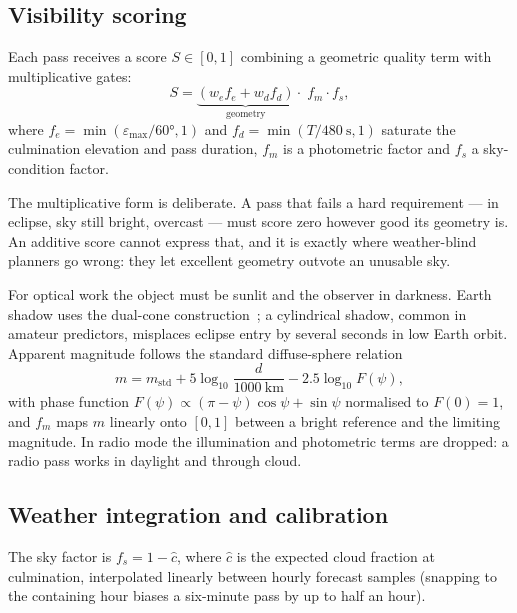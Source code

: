 \documentclass[conference]{IEEEtran}
\begin{document}
\subsection{Visibility scoring}
Each pass receives a score $S \in [0,1]$ combining a geometric quality term with
multiplicative gates:
\begin{equation}
S = \underbrace{\left(w_e f_e + w_d f_d\right)}_{\text{geometry}}
    \cdot \; f_m \cdot f_s ,
\label{eq:score}
\end{equation}
where $f_e = \min(\varepsilon_\mathrm{max}/\ang{60},1)$ and
$f_d = \min(T/\SI{480}{\second},1)$ saturate the culmination elevation and pass
duration, $f_m$ is a photometric factor and $f_s$ a sky-condition factor.

The multiplicative form is deliberate. A pass that fails a hard requirement ---
in eclipse, sky still bright, overcast --- must score zero however good its
geometry is. An additive score cannot express that, and it is exactly where
weather-blind planners go wrong: they let excellent geometry outvote an
unusable sky.

For optical work the object must be sunlit and the observer in darkness. Earth
shadow uses the dual-cone construction~\cite{vallado2013fundamentals}; a
cylindrical shadow, common in amateur predictors, misplaces eclipse entry by
several seconds in low Earth orbit. Apparent magnitude follows the standard
diffuse-sphere relation~\cite{hejduk2011phase, mccants}
\begin{equation}
m = m_\mathrm{std} + 5\log_{10}\!\frac{d}{\SI{1000}{\kilo\metre}}
    - 2.5\log_{10} F(\psi),
\label{eq:mag}
\end{equation}
with phase function
$F(\psi) \propto (\pi-\psi)\cos\psi + \sin\psi$ normalised to $F(0)=1$, and
$f_m$ maps $m$ linearly onto $[0,1]$ between a bright reference and the limiting
magnitude. In radio mode the illumination and photometric terms are dropped: a
radio pass works in daylight and through cloud.

\subsection{Weather integration and calibration}
\label{sec:calib}
The sky factor is $f_s = 1 - \hat{c}$, where $\hat{c}$ is the expected cloud
fraction at culmination, interpolated linearly between hourly forecast samples
(snapping to the containing hour biases a six-minute pass by up to half an hour).
\end{document}
